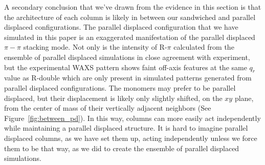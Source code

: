 \documentclass[journal=jpcbfk,manuscript=article]{achemso}
\begin{document}
  A secondary conclusion that we've drawn from the evidence in this section is 
  that the architecture of each column is likely in between our sandwiched
  and parallel displaced configurations. The parallel displaced configuration 
  that we have simulated in this paper is an exaggerated manifestation of the 
  parallel displaced $\pi-\pi$ stacking mode. Not only is the intensity of R-$\pi$
  calculated from the ensemble of parallel displaced simulations in close agreement
  with experiment, but the experimental WAXS pattern shows faint off-axis features
  at the same $q_r$ value as R-double which are only present in simulated patterns
  generated from parallel displaced configurations. The monomers may prefer to be
  parallel displaced, but their displacement is likely only slightly shifted, on 
  the $xy$ plane, from the center of mass of their vertically adjacent neighbors 
  (See Figure~\ref{fig:between_pd}). In this way, columns can more easily act 
  independently while maintaining a parallel displaced structure. It is hard to
  imagine parallel displaced columns, as we have set them up, acting independently 
  unless we force them to be that way, as we did to create the ensemble of parallel
  displaced simulations. 
  
\end{document}
